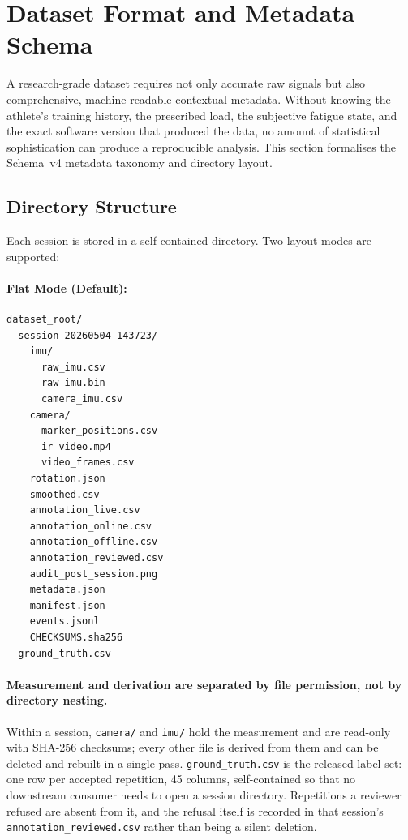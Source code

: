 \section{Dataset Format and Metadata Schema}\label{sec:dataset}

A research-grade dataset requires not only accurate raw signals but also comprehensive, machine-readable contextual metadata.
Without knowing the athlete's training history, the prescribed load, the subjective fatigue state, and the exact software version that produced the data, no amount of statistical sophistication can produce a reproducible analysis.
This section formalises the Schema~v4 metadata taxonomy and directory layout.


\subsection{Directory Structure}

Each session is stored in a self-contained directory.
Two layout modes are supported:

\paragraph{Flat Mode (Default):}
\begin{lstlisting}[numbers=none, basicstyle=\ttfamily\footnotesize, frame=none, backgroundcolor=\color{white}]
dataset_root/
  session_20260504_143723/
    imu/
      raw_imu.csv
      raw_imu.bin
      camera_imu.csv
    camera/
      marker_positions.csv
      ir_video.mp4
      video_frames.csv
    rotation.json
    smoothed.csv
    annotation_live.csv
    annotation_online.csv
    annotation_offline.csv
    annotation_reviewed.csv
    audit_post_session.png
    metadata.json
    manifest.json
    events.jsonl
    CHECKSUMS.sha256
  ground_truth.csv
\end{lstlisting}

\paragraph{Measurement and derivation are separated by file permission, not by
directory nesting.} Within a session, \texttt{camera/} and \texttt{imu/} hold the
measurement and are read-only with SHA-256 checksums; every other file is derived from
them and can be deleted and rebuilt in a single pass. \texttt{ground\_truth.csv} is the
released label set: one row per accepted repetition, 45 columns, self-contained so that
no downstream consumer needs to open a session directory. Repetitions a reviewer refused
are absent from it, and the refusal itself is recorded in that session's
\texttt{annotation\_reviewed.csv} rather than being a silent deletion.

